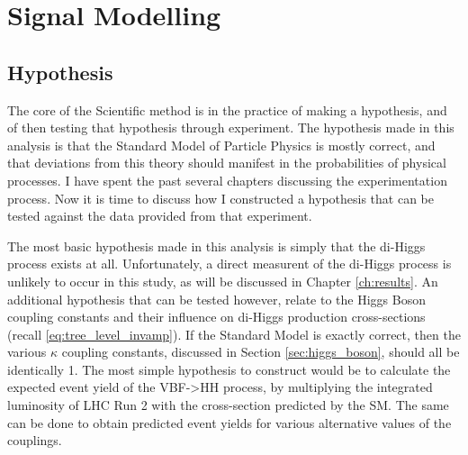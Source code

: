 \chapter{Signal Modelling}


\section{Hypothesis}

    The core of the Scientific method is in the practice of making a hypothesis, and of then testing that hypothesis through experiment.
    The hypothesis made in this analysis is that the Standard Model of Particle Physics is mostly correct,
        and that deviations from this theory should manifest in the probabilities of physical processes.
    I have spent the past several chapters discussing the experimentation process.
    Now it is time to discuss how I constructed a hypothesis that can be tested against the data provided from that experiment.

    The most basic hypothesis made in this analysis is simply that the di-Higgs process exists at all.
    Unfortunately, a direct measurent of the di-Higgs process is unlikely to occur in this study, as will be discussed in Chapter \ref{ch:results}.
    An additional hypothesis that can be tested however,
        relate to the Higgs Boson coupling constants and their influence on di-Higgs production cross-sections
        (recall \ref{eq:tree_level_invamp}).
    If the Standard Model is exactly correct, then the various $\kappa$ coupling constants,
        discussed in Section \ref{sec:higgs_boson},
        should all be identically 1.
    The most simple hypothesis to construct would be to calculate the expected event yield of the VBF->HH process,
        by multiplying the integrated luminosity of LHC Run 2 with the cross-section predicted by the SM.
    The same can be done to obtain predicted event yields for various alternative values of the couplings.

